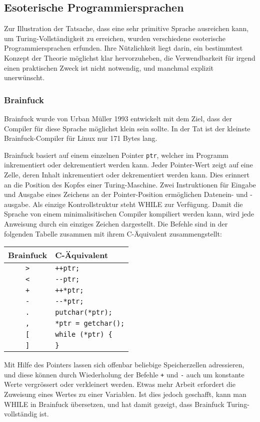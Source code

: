 \subsection{Esoterische Programmiersprachen}
%
Zur Illustration der Tatsache, dass eine sehr primitive Sprache
ausreichen kann, um Turing-Vollständigkeit zu erreichen, wurden
verschiedene esoterische Programmiersprachen erfunden.
Ihre Nützlichkeit liegt darin, ein bestimmtest Konzept der Theorie
möglichst klar hervorzuheben, die Verwendbarkeit für irgend einen
praktischen Zweck ist nicht notwendig, und manchmal explizit unerwünscht.

\subsubsection{Brainfuck}
%
Brainfuck
wurde von Urban Müller 1993 entwickelt mit dem Ziel, dass der
Compiler für diese Sprache möglichst klein sein sollte.
In der Tat ist der kleinste Brainfuck-Compiler für Linux nur 171 Bytes lang.

Brainfuck basiert auf einem einzelnen Pointer {\tt ptr}, welcher
im Programm inkrementiert oder dekrementiert werden kann.
Jeder Pointer-Wert zeigt auf eine Zelle, deren Inhalt inkrementiert
oder dekrementiert werden kann.
Dies erinnert an die Position des Kopfes einer Turing-Maschine.
Zwei Instruktionen für Eingabe und Ausgabe eines Zeichens
an der Pointer-Position ermöglichen Datenein- und -ausgabe.
Als einzige Kontrollstruktur steht WHILE zur Verfügung.
Damit die Sprache von einem minimalisitischen Compiler kompiliert
werden kann, wird jede Anweisung durch ein einziges Zeichen
dargestellt.
Die Befehle sind in der folgenden Tabelle
zusammen mit ihrem C-Äquivalent zusammengstellt:
\begin{center}
\begin{tabular}{|c|l|}
\hline
Brainfuck&C-Äquivalent\\
\hline
{\tt >}&\verb/++ptr;/\\
{\tt <}&\verb/--ptr;/\\
{\tt +}&\verb/++*ptr;/\\
{\tt -}&\verb/--*ptr;/\\
{\tt .}&\verb/putchar(*ptr);/\\
{\tt ,}&\verb/*ptr = getchar();/\\
{\tt [}&\verb/while (*ptr) {/\\
{\tt ]}&\verb/}/\\
\hline
\end{tabular}
\end{center}
Mit Hilfe des Pointers lassen sich offenbar beliebige Speicherzellen
adressieren, und diese können durch Wiederholung der Befehle {\tt +}
und {\tt -} auch um konstante Werte vergrössert
oder verkleinert werden.
Etwas mehr Arbeit erfordert die Zuweisung
eines Wertes zu einer Variablen.
Ist dies jedoch geschafft, kann
man WHILE in Brainfuck übersetzen, und hat damit gezeigt, dass
Brainfuck Turing-vollständig ist.

